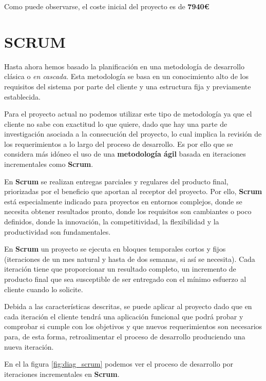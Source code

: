 \bigskip
Como puede observarse, el coste inicial del proyecto es de \textbf{7940\euro}

\section{SCRUM}

Hasta ahora hemos basado la planificación en una metodología de desarrollo clásica o \textit{en cascada}. Esta metodología se basa en un conocimiento alto de los requisitos del sistema por parte del cliente y una estructura fija y previamente establecida. 

\bigskip
Para el proyecto actual no podemos utilizar este tipo de metodología ya que el cliente no sabe con exactitud lo que quiere, dado que hay una parte de investigación asociada a la consecución del proyecto, lo cual implica la revisión de los requerimientos a lo largo del proceso de desarrollo. Es por ello que se considera más idóneo el uso de una \textbf{metodología ágil} basada en iteraciones incrementales como \textbf{Scrum}.

\bigskip
En \textbf{Scrum} se realizan entregas parciales y regulares del producto final, priorizadas por el beneficio que aportan al receptor del proyecto. Por ello, \textbf{Scrum} está especialmente indicado para proyectos en entornos complejos, donde se necesita obtener resultados pronto, donde los requisitos son cambiantes o poco definidos, donde la innovación, la competitividad, la flexibilidad y la productividad son fundamentales.\cite{PASCRUM}

\bigskip
En \textbf{Scrum} un proyecto se ejecuta en bloques temporales cortos y fijos (iteraciones de un mes natural y hasta de dos semanas, si así se necesita). Cada iteración tiene que proporcionar un resultado completo, un incremento de producto final que sea susceptible de ser entregado con el mínimo esfuerzo al cliente cuando lo solicite.

\bigskip
Debida a las características descritas, se puede aplicar al proyecto dado que en cada iteración el cliente tendrá una aplicación funcional que podrá probar y comprobar si cumple con los objetivos y que nuevos requerimientos son necesarios para, de esta forma, retroalimentar el proceso de desarrollo produciendo una nueva iteración.

\bigskip
En el la figura \ref{fig:diag_scrum} podemos ver el proceso de desarrollo por iteraciones incrementales en \textbf{Scrum}.

